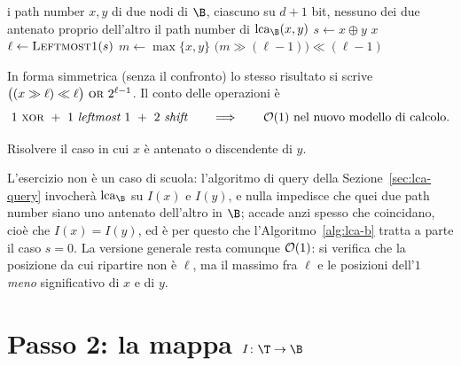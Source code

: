 \begin{algorithm}[H]
  \caption{$\lca_{\B}$ in un albero binario completo (nessuno dei due nodi antenato
    dell'altro)}
  \label{alg:lca-b}
  \begin{algorithmic}[1]
    \Require i path number $x,y$ di due nodi di $\B$, ciascuno su $d+1$ bit, nessuno
      dei due antenato proprio dell'altro
    \Ensure il path number di $\lca_{\B}(x,y)$
    \State $s \gets x \oplus y$ 
     
      \State \Return $x$
    \EndIf
    \State $\ell \gets \textsc{Leftmost1}(s)$ 
    \State $m \gets \max\{x,y\}$ 
    \State \Return $\bigl(m \gg (\ell-1)\bigr) \ll (\ell-1)$ 
  \end{algorithmic}
\end{algorithm}

In forma simmetrica (senza il confronto) lo stesso risultato si scrive
$\bigl((x \gg \ell)\ll \ell\bigr)\ \textsc{or}\ 2^{\ell-1}$. Il conto delle operazioni
è
\[
  1\ \textsc{xor} \ +\ 1\ \textit{leftmost } 1 \ +\ 2\ \textit{shift}
  \qquad\Longrightarrow\qquad \Oh(1) \ \text{nel nuovo modello di calcolo.}
\]

\begin{esercizio}
  Risolvere il caso in cui $x$ è antenato o discendente di $y$.
\end{esercizio}

\begin{osservazione}
  L'esercizio non è un caso di scuola: l'algoritmo di query della
  Sezione~\ref{sec:lca-query} invocherà $\lca_{\B}$ su $I(x)$ e $I(y)$, e nulla
  impedisce che quei due path number siano uno antenato dell'altro in $\B$; accade
  anzi spesso che coincidano, cioè che $I(x)=I(y)$, ed è per questo che
  l'Algoritmo~\ref{alg:lca-b} tratta a parte il caso $s=0$. La versione generale resta
  comunque $\mathcal{O}(1)$: si verifica che la posizione da cui ripartire non è $\ell$, ma il
  massimo fra $\ell$ e le posizioni dell'$1$ \emph{meno} significativo di $x$ e di $y$.
\end{osservazione}

\section{Passo 2: la mappa \texorpdfstring{$I\colon\T\to\B$}{I : T -> B}}
\label{sec:lca-passo2}


